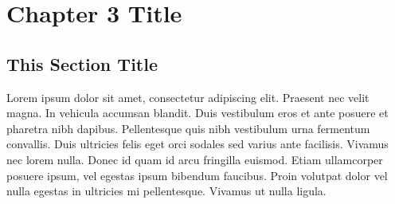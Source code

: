 \chapter{Chapter 3 Title}
\label{sec:chap3}
\thispagestyle{myheadings}

\section{This Section Title}
\label{sec:thissec}

Lorem ipsum dolor sit amet, consectetur adipiscing elit. Praesent nec velit magna. In vehicula accumsan blandit. Duis vestibulum eros et ante posuere et pharetra nibh dapibus. Pellentesque quis nibh vestibulum urna fermentum convallis. Duis ultricies felis eget orci sodales sed varius ante facilisis. Vivamus nec lorem nulla. Donec id quam id arcu fringilla euismod. Etiam ullamcorper posuere ipsum, vel egestas ipsum bibendum faucibus. Proin volutpat dolor vel nulla egestas in ultricies mi pellentesque. Vivamus ut nulla ligula. 

